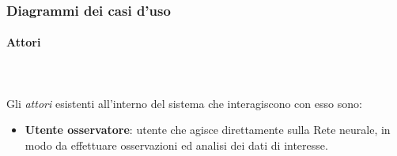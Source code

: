 \subsubsection{Diagrammi dei casi d'uso}
\label{casi d'uso}
\paragraph{Attori}\mbox{}\\\\
\label{Attori}
\noindent
Gli \textit{attori} esistenti all'interno del sistema che interagiscono con esso sono:
\begin{itemize}
\item \textbf{Utente osservatore}: utente che agisce direttamente sulla Rete neurale, in modo da effettuare osservazioni ed analisi dei dati di interesse.
\end{itemize}

